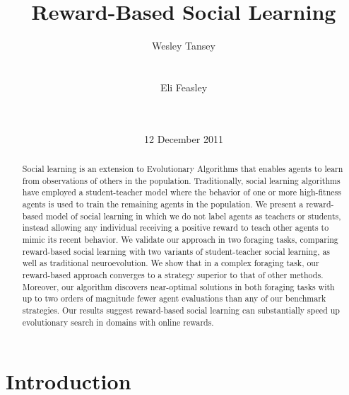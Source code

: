 \documentclass{acm_proc_article-sp}
\begin{document}
\title{Reward-Based Social Learning}

\author{
\alignauthor
Wesley Tansey\\
       \\
       \\
\alignauthor
Eli Feasley\\
       \\
       \\
}
\date{12 December 2011}


\maketitle
\begin{abstract}
Social learning is an extension to Evolutionary Algorithms that enables agents to learn from observations of others in the population. Traditionally, social learning algorithms have employed a student-teacher model where the behavior of one or more high-fitness agents is used to train the remaining agents in the population. We present a reward-based model of social learning in which we do not label agents as teachers or students, instead allowing any individual receiving a positive reward to teach other agents to mimic its recent behavior. We validate our approach in two foraging tasks, comparing reward-based social learning with two variants of student-teacher social learning, as well as traditional neuroevolution. We show that in a complex foraging task, our reward-based approach converges to a strategy superior to that of other methods. Moreover, our algorithm discovers near-optimal solutions in both foraging tasks with up to two orders of magnitude fewer agent evaluations than any of our benchmark strategies. Our results suggest reward-based social learning can substantially speed up evolutionary search in domains with online rewards.
\end{abstract}


\section{Introduction}
\end{document}
